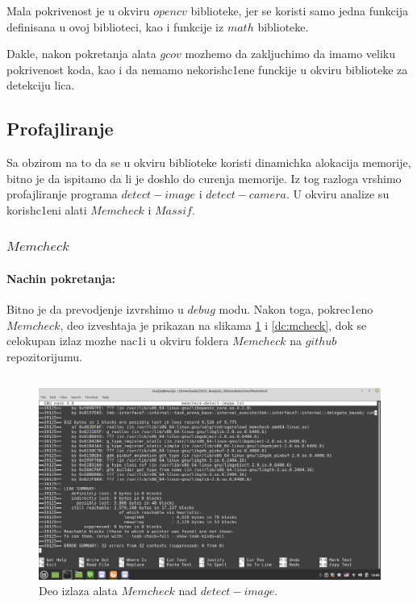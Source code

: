 \documentclass{article}
\begin{document}
Mala pokrivenost je u okviru $opencv$ biblioteke, jer se koristi samo jedna funkcija definisana u ovoj biblioteci, kao i funkcije iz $math$ biblioteke. 

Dakle, nakon pokretanja alata $gcov$ mozhemo da zakljuchimo da imamo veliku pokrivenost koda, kao i da nemamo nekorish\-c1ene funckije u okviru biblioteke za detekciju lica.

\subsection{Profajliranje}
Sa obzirom na to da se u okviru biblioteke koristi dinamichka alokacija memorije, bitno je da ispitamo da li je doshlo do curenja memorije. Iz tog razloga vrshimo profajliranje programa $detect-image$ i $detect-camera$. U okviru analize su korish\-c1eni alati $Memcheck$ i $Massif$.
\subsubsection{$Memcheck$}

\paragraph{Nachin pokretanja:} 
Bitno je da prevodjenje izvrshimo u $debug$ modu. Nakon toga, pokrec1eno $Memcheck$, deo izveshtaja je prikazan na slikama \ref{di:mcheck} i \ref{dc:mcheck}, dok se celokupan izlaz mozhe nac1i u okviru foldera $Memcheck$ na $github$ repozitorijumu. 
\selectfont
\inputminted[]{shell-session}{run_memcheck.sh}

\selectfont
\begin{figure}[H]
    \centering
    \includegraphics[width=12cm]{img/memcheck/memcheck-detect-image.png}
    \caption{Deo izlaza alata $Memcheck$ nad $detect-image.$}
    \label{di:mcheck}
\end{figure}
\end{document}
